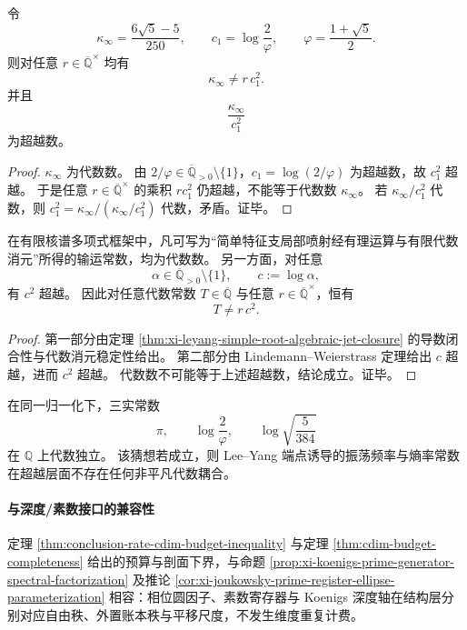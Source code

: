 \begin{theorem}\label{thm:xi-leyang-kappa-vs-c1-square-obstruction}
令
\[
\kappa_{\infty}=\frac{6\sqrt5-5}{250},
\qquad
c_1=\log\!\frac{2}{\varphi},
\qquad
\varphi=\frac{1+\sqrt5}{2}.
\]
则对任意 \(r\in\overline{\mathbb Q}^{\times}\) 均有
\[
\kappa_{\infty}\neq r\,c_1^2.
\]
并且
\[
\frac{\kappa_{\infty}}{c_1^2}
\]
为超越数。
\end{theorem}
\begin{proof}
\(\kappa_{\infty}\) 为代数数。
由 \(2/\varphi\in\overline{\mathbb Q}_{>0}\setminus\{1\}\)，\(c_1=\log(2/\varphi)\) 为超越数，故 \(c_1^2\) 超越。
于是任意 \(r\in\overline{\mathbb Q}^{\times}\) 的乘积 \(r c_1^2\) 仍超越，不能等于代数数 \(\kappa_{\infty}\)。
若 \(\kappa_{\infty}/c_1^2\) 代数，则 \(c_1^2=\kappa_{\infty}/(\kappa_{\infty}/c_1^2)\) 代数，矛盾。证毕。
\end{proof}

\begin{corollary}[代数输运常数与对数熵常数之间不存在闭合平方律]\label{cor:xi-leyang-algebraic-transport-vs-log-entropy-no-square-law}
在有限核谱多项式框架中，凡可写为“简单特征支局部喷射经有理运算与有限代数消元”所得的输运常数，均为代数数。
另一方面，对任意
\[
\alpha\in\overline{\mathbb Q}_{>0}\setminus\{1\},
\qquad
c:=\log\alpha,
\]
有 \(c^2\) 超越。
因此对任意代数常数 \(T\in\overline{\mathbb Q}\) 与任意 \(r\in\overline{\mathbb Q}^{\times}\)，恒有
\[
T\neq r\,c^2.
\]
\end{corollary}
\begin{proof}
第一部分由定理 \ref{thm:xi-leyang-simple-root-algebraic-jet-closure} 的导数闭合性与代数消元稳定性给出。
第二部分由 Lindemann--Weierstrass 定理给出 \(c\) 超越，进而 \(c^2\) 超越。
代数数不可能等于上述超越数，结论成立。证毕。
\end{proof}

\begin{conjecture}[对数奇点常数的超越独立性]\label{conj:xi-leyang-log-singularity-transcendence-independence}
在同一归一化下，三实常数
\[
\pi,\qquad
\log\!\frac{2}{\varphi},\qquad
\log\sqrt{\frac{5}{384}}
\]
在 \(\mathbb Q\) 上代数独立。
该猜想若成立，则 Lee--Yang 端点诱导的振荡频率与熵率常数在超越层面不存在任何非平凡代数耦合。
\end{conjecture}

\paragraph{与深度/素数接口的兼容性}
定理 \ref{thm:conclusion-rate-cdim-budget-inequality} 与定理 \ref{thm:cdim-budget-completeness}
给出的预算与剖面下界，与命题 \ref{prop:xi-koenigs-prime-generator-spectral-factorization} 及推论 \ref{cor:xi-joukowsky-prime-register-ellipse-parameterization} 相容：相位圆因子、素数寄存器与 Koenigs 深度轴在结构层分别对应自由秩、外置账本秩与平移尺度，不发生维度重复计费。
\endinput
